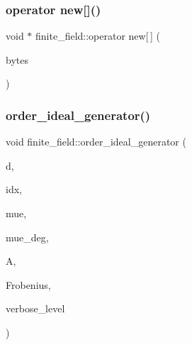 \subsubsection{\texorpdfstring{operator new[]()}{operator new[]()}}
{\footnotesize\ttfamily void $\ast$ finite\+\_\+field\+::operator new\mbox{[}$\,$\mbox{]} (\begin{DoxyParamCaption}\item[{size\+\_\+t}]{bytes }\end{DoxyParamCaption})}

\mbox{\label{classfinite__field_a1655fa09673bda2c6b7b033bd6f63a01}} 
\subsubsection{\texorpdfstring{order\+\_\+ideal\+\_\+generator()}{order\_ideal\_generator()}}
{\footnotesize\ttfamily void finite\+\_\+field\+::order\+\_\+ideal\+\_\+generator (\begin{DoxyParamCaption}\item[{\mbox{\hyperlink{galois_8h_a09fddde158a3a20bd2dcadb609de11dc}{I\+NT}}}]{d,  }\item[{\mbox{\hyperlink{galois_8h_a09fddde158a3a20bd2dcadb609de11dc}{I\+NT}}}]{idx,  }\item[{\mbox{\hyperlink{galois_8h_a09fddde158a3a20bd2dcadb609de11dc}{I\+NT}} $\ast$}]{mue,  }\item[{\mbox{\hyperlink{galois_8h_a09fddde158a3a20bd2dcadb609de11dc}{I\+NT}} \&}]{mue\+\_\+deg,  }\item[{\mbox{\hyperlink{galois_8h_a09fddde158a3a20bd2dcadb609de11dc}{I\+NT}} $\ast$}]{A,  }\item[{\mbox{\hyperlink{galois_8h_a09fddde158a3a20bd2dcadb609de11dc}{I\+NT}} $\ast$}]{Frobenius,  }\item[{\mbox{\hyperlink{galois_8h_a09fddde158a3a20bd2dcadb609de11dc}{I\+NT}}}]{verbose\+\_\+level }\end{DoxyParamCaption})}

\mbox{\label{classfinite__field_a7f4cbb62d037e07893f3c868eea3b818}} 
